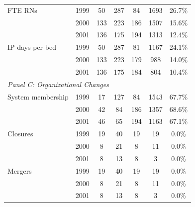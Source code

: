 \begin{tabular}{l c cc cc c}
FTE RNs & 1999 & 50 & 287 & 84 & 1693 & 26.7\% \\
 & 2000 & 133 & 223 & 186 & 1507 & 15.6\% \\
 & 2001 & 136 & 175 & 194 & 1313 & 12.4\% \\
IP days per bed & 1999 & 50 & 287 & 81 & 1167 & 24.1\% \\
 & 2000 & 133 & 223 & 179 & 988 & 14.0\% \\
 & 2001 & 136 & 175 & 184 & 804 & 10.4\% \\
\midrule
\multicolumn{7}{l}{\textit{Panel C: Organizational Changes}} \\
System membership & 1999 & 17 & 127 & 84 & 1543 & 67.7\% \\
 & 2000 & 42 & 84 & 186 & 1357 & 68.6\% \\
 & 2001 & 46 & 65 & 194 & 1163 & 67.1\% \\
Closures & 1999 & 19 & 40 & 19 & 19 & 0.0\% \\
 & 2000 & 8 & 21 & 8 & 11 & 0.0\% \\
 & 2001 & 8 & 13 & 8 & 3 & 0.0\% \\
Mergers & 1999 & 19 & 40 & 19 & 19 & 0.0\% \\
 & 2000 & 8 & 21 & 8 & 11 & 0.0\% \\
 & 2001 & 8 & 13 & 8 & 3 & 0.0\% \\
\bottomrule
\end{tabular}

